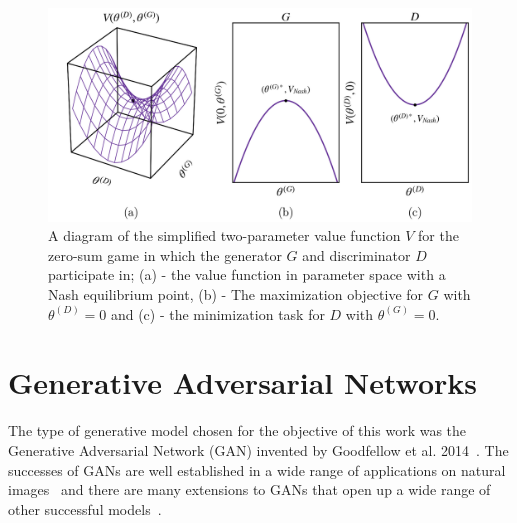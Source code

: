 \documentclass[twocolumn]{article}
\numberwithin{equation}{section}
\begin{document}
\begin{figure}%
\includegraphics[width=15cm]{figures/diagrams/gan_game.png}
\centering
\caption{A diagram of the simplified two-parameter value function $V$ for the zero-sum game in which the generator $G$ and 
discriminator $D$ participate in; (a) - the value function in parameter space with a Nash equilibrium point, (b) - The 
maximization objective for $G$ with $\theta^{(D)}=0$ and (c) - the minimization task for $D$ with $\theta^{(G)}=0$.}
\label{fig:gan_game}
\end{figure}


\section{Generative Adversarial Networks}\label{sec:gans}

The type of generative model chosen for the objective of this work was the Generative Adversarial Network (GAN) invented 
by Goodfellow et al. 2014~\cite{gf_gan}. The successes of GANs are well established in a wide range of applications on 
natural images~\cite{wgan, karrasgan, largegan} and there are many extensions to GANs that open up a wide range of other
successful models~\cite{pix2pix, hiresgan, lapgan}. 
\end{document}
